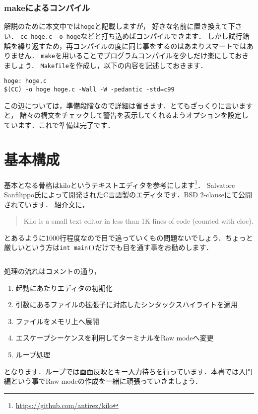 \subsubsection{makeによるコンパイル}
解説のために本文中では\texttt{hoge}と記載しますが，
好きな名前に置き換えて下さい．
\texttt{cc hoge.c -o hoge}などと打ち込めばコンパイルできます．
しかし試行錯誤を繰り返すため，再コンパイルの度に同じ事をするのはあまりスマートではありません．
\texttt{make}を用いることでプログラムコンパイルを少しだけ楽にしておきましょう．
\texttt{Makefile}を作成し，以下の内容を記述しておきます．
\begin{verbatim}
hoge: hoge.c
$(CC) -o hoge hoge.c -Wall -W -pedantic -std=c99
\end{verbatim}
この辺については，準備段階なので詳細は省きます．とてもざっくりに言いますと，
諸々の構文をチェックして警告を表示してくれるようオプションを設定しています．これで準備は完了です．

\section{基本構成}
基本となる骨格はkiloというテキストエディタを参考にします\footnote{\url{https://github.com/antirez/kilo}}．
Salvatore Sanfilippo氏によって開発されたC言語製のエディタです．BSD 2-clauseにて公開されています．
紹介文に，
\begin{quote}
Kilo is a small text editor in less than 1K lines of code (counted with cloc).
\end{quote}
とあるように1000行程度なので目で追っていくもの問題ないでしょう．ちょっと厳しいという方は\texttt{int main()}だけでも目を通す事をお勧めします．
\inputminted[frame=lines,framesep=2mm,baselinestretch=1.2,fontsize=\footnotesize,linenos,breaklines]{c}{\takuzooasset/main.c}
処理の流れはコメントの通り，
\begin{enumerate}
\item 起動にあたりエディタの初期化
\item 引数にあるファイルの拡張子に対応したシンタックスハイライトを適用
\item ファイルをメモリ上へ展開
\item エスケープシーケンスを利用してターミナルをRaw modeへ変更
\item ループ処理
\end{enumerate}
となります．ループでは画面反映とキー入力待ちを行っています．本書では入門編という事でRaw modeの作成を一緒に頑張っていきましょう．

